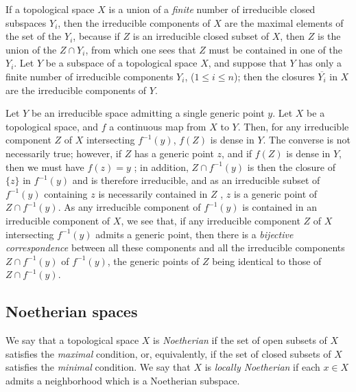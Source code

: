 \begin{env}[2.1.7]
\label{0.2.1.7}
If a topological space $X$ is a union of a \emph{finite} number of irreducible closed subspaces $Y_i$, then the irreducible components of $X$ are the maximal elements of the set of the $Y_i$, because if $Z$ is an irreducible closed subset of $X$, then $Z$ is the union of the $Z\cap Y_i$, from which one sees that $Z$ must be contained in one of the $Y_i$.
Let $Y$ be a subspace of a topological space $X$, and suppose that $Y$ has only a finite number of irreducible components $Y_i$, ($1\leqslant i\leqslant n$); then the closures $\overline{Y_i}$ in $X$ are the irreducible components of $Y$.
\end{env}

\begin{env}[2.1.8]
\label{0.2.1.8}
Let $Y$ be an irreducible space admitting a single generic point $y$.
Let $X$ be a topological space, and $f$ a continuous map from $X$ to $Y$.
Then, for any irreducible component $Z$ of $X$ intersecting $f^{-1}(y)$, $f(Z)$ is dense in $Y$.
The converse is not necessarily true; however, if $Z$ has a generic point $z$, and if $f(Z)$ is dense in $Y$, then we must have $f(z)=y$ ; in addition, $Z\cap f^{-1}(y)$ is then the closure of $\{z\}$ in $f^{-1}(y)$ and is therefore irreducible, and as an irreducible subset of $f^{-1}(y)$ containing $z$ is necessarily contained in $Z$ , $z$ is a generic point of $Z\cap f^{-1}(y)$.
As any irreducible component of $f^{-1}(y)$ is contained in an irreducible component of $X$, we see that, if any irreducible component $Z$ of $X$ intersecting $f^{-1}(y)$ admits a generic point, then there is a \emph{bijective correspondence} between all these components and all the irreducible components $Z\cap f^{-1}(y)$ of $f^{-1}(y)$, the generic points of $Z$ being identical to those of $Z\cap f^{-1}(y)$.
\end{env}

\subsection{Noetherian spaces}
\label{subsection-noetherian-spaces}

\begin{env}[2.2.1]
\label{0.2.2.1}
We say that a topological space $X$ is \emph{Noetherian} if the set of open subsets of $X$ satisfies the \emph{maximal} condition, or, equivalently, if the set of closed subsets of $X$ satisfies the \emph{minimal} condition.
We say that $X$ is \emph{locally Noetherian} if each $x\in X$ admits a neighborhood which is a Noetherian subspace.
\end{env}

